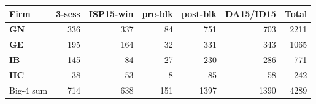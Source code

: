 \begin{tabular}{l r r r r r r}
\toprule
Firm & 3-sess & ISP15-win & pre-blk & post-blk & \textbf{DA15/ID15} & Total \\
\midrule
\textbf{GN} & 336 & 337 & 84 & 751 & 703 & 2211 \\
\textbf{GE} & 195 & 164 & 32 & 331 & 343 & 1065 \\
\textbf{IB} & 145 & 84 & 27 & 230 & 286 & 771 \\
\textbf{HC} & 38 & 53 & 8 & 85 & 58 & 242 \\
\midrule
Big-4 sum & 714 & 638 & 151 & 1397 & 1390 & 4289 \\
\bottomrule
\end{tabular}
